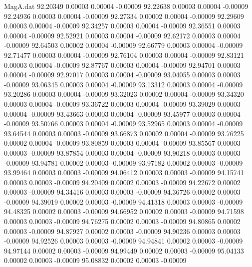 \begin{filecontents}{MagA.dat}
  92.20349    0.00003    0.00004   -0.00009
  92.22638    0.00003    0.00004   -0.00009
  92.24936    0.00003    0.00004   -0.00009
  92.27334    0.00002    0.00004   -0.00009
  92.29609    0.00003    0.00004   -0.00009
  92.34257    0.00003    0.00004   -0.00009
  92.36551    0.00003    0.00004   -0.00009
  92.52921    0.00003    0.00004   -0.00009
  92.62172    0.00003    0.00004   -0.00009
  92.64503    0.00002    0.00004   -0.00009
  92.66779    0.00003    0.00004   -0.00009
  92.71477    0.00003    0.00004   -0.00009
  92.76104    0.00003    0.00004   -0.00009
  92.83121    0.00003    0.00004   -0.00009
  92.87767    0.00003    0.00004   -0.00009
  92.94701    0.00003    0.00004   -0.00009
  92.97017    0.00003    0.00004   -0.00009
  93.04055    0.00003    0.00003   -0.00009
  93.06345    0.00003    0.00004   -0.00009
  93.13312    0.00003    0.00004   -0.00009
  93.20286    0.00003    0.00004   -0.00009
  93.32023    0.00002    0.00004   -0.00009
  93.34320    0.00003    0.00004   -0.00009
  93.36722    0.00003    0.00004   -0.00009
  93.39029    0.00003    0.00004   -0.00009
  93.43663    0.00003    0.00004   -0.00009
  93.45977    0.00003    0.00004   -0.00009
  93.50766    0.00003    0.00004   -0.00009
  93.52965    0.00003    0.00004   -0.00009
  93.64544    0.00003    0.00003   -0.00009
  93.66873    0.00002    0.00004   -0.00009
  93.76225    0.00002    0.00004   -0.00009
  93.80859    0.00003    0.00004   -0.00009
  93.85567    0.00003    0.00003   -0.00009
  93.87854    0.00003    0.00004   -0.00009
  93.90218    0.00003    0.00003   -0.00009
  93.94781    0.00002    0.00003   -0.00009
  93.97182    0.00002    0.00003   -0.00009
  93.99464    0.00003    0.00003   -0.00009
  94.06412    0.00003    0.00003   -0.00009
  94.15741    0.00003    0.00003   -0.00009
  94.20409    0.00002    0.00003   -0.00009
  94.22672    0.00002    0.00003   -0.00009
  94.34416    0.00003    0.00003   -0.00009
  94.36726    0.00002    0.00003   -0.00009
  94.39019    0.00002    0.00003   -0.00009
  94.41318    0.00003    0.00003   -0.00009
  94.48325    0.00002    0.00003   -0.00009
  94.66952    0.00002    0.00003   -0.00009
  94.71598    0.00003    0.00003   -0.00009
  94.76275    0.00002    0.00003   -0.00009
  94.80865    0.00002    0.00003   -0.00009
  94.87927    0.00002    0.00003   -0.00009
  94.90236    0.00003    0.00003   -0.00009
  94.92526    0.00003    0.00003   -0.00009
  94.94841    0.00002    0.00003   -0.00009
  94.97144    0.00002    0.00003   -0.00009
  94.99449    0.00002    0.00003   -0.00009
  95.04133    0.00002    0.00003   -0.00009
  95.08832    0.00002    0.00003   -0.00009

\end{filecontents}
